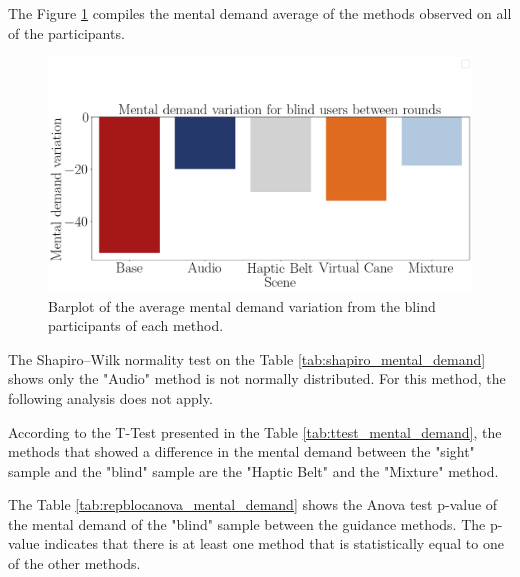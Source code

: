 

The Figure \ref{fig:barplot_md_var_scene_blind} compiles the mental demand average of the methods observed on all of the participants.

\begin{figure}[!htb]
    \centering
    \includegraphics[width = 0.8\linewidth]{Resultados/Nasa/Figuras/png/barplot_md_var_scene_blind.png}
    \caption{Barplot of the average mental demand variation from the blind participants of each method.}
    \label{fig:barplot_md_var_scene_blind}
\end{figure}

The Shapiro–Wilk normality test on the Table \ref{tab:shapiro_mental_demand} shows only the "Audio" method is not normally distributed. For this method, the following analysis does not apply.

According to the T-Test presented in the Table \ref{tab:ttest_mental_demand}, the methods that showed a difference in the mental demand between the "sight" sample and the "blind" sample are the "Haptic Belt" and the "Mixture" method.

\begin{table}[!htb]
    \begin{minipage}{.45\linewidth}
        
    \end{minipage}
    \hfill
    \begin{minipage}{.45\linewidth}
        \vspace{-2.75cm}
        
    \end{minipage}
\end{table}

The Table \ref{tab:repblocanova_mental_demand} shows the Anova test p-value of the mental demand of the "blind" sample between the guidance methods. The p-value indicates that there is at least one method that is statistically equal to one of the other methods.

